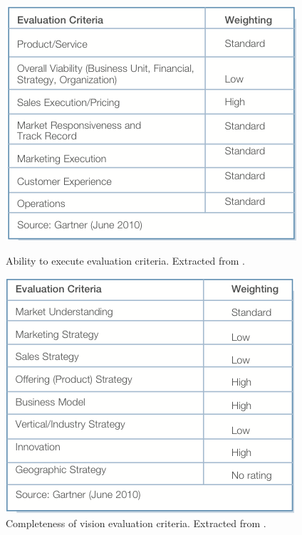 \begin{figure}[h!]
\begin{minipage}[h!]{0.45\linewidth}
\centering
\includegraphics[width=\textwidth]{img/MQPPMToolsAbilityExecute.png}
\caption{Ability to execute evaluation criteria. Extracted from \cite{magicQuadrantPPM}.} 
\label{fig:figure1}
\end{minipage}
\hspace{0.5cm}
\begin{minipage}[h!]{0.45\linewidth}
\centering
\includegraphics[width=\textwidth]{img/MQPPMToolsCompletess.png}
\caption{Completeness of vision evaluation criteria. Extracted from \cite{magicQuadrantPPM}.}
\label{fig:figure2}
\end{minipage}
\end{figure}



